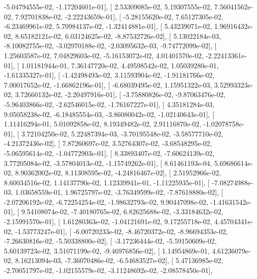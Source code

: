\documentclass{article}
\begin{document}
         -5.04794555e-02,  -1.17204601e-01],
       [  2.53309085e-02,   5.19307555e-02,   7.56041562e-02,
          7.92701838e-02,  -2.22243659e-01],
       [ -5.28155620e-02,   7.65127305e-02,  -6.23469961e-02,
          5.70984137e-02,  -1.32414881e-01],
       [  5.43239071e-02,   1.96916432e-02,   8.65182121e-02,
          6.03124625e-02,  -8.87532726e-02],
       [  5.13022184e-03,  -8.10082755e-02,  -3.02970188e-02,
         -2.03095632e-03,  -9.74772099e-02],
       [  1.25603587e-02,   7.04829603e-02,  -5.16153072e-02,
          4.01401570e-02,  -2.22413361e-01],
       [  1.01181944e-01,   7.36147720e-02,   4.49598542e-02,
          1.05039280e-01,  -1.61335327e-01],
       [ -1.42498493e-02,   3.11593904e-02,  -1.91181766e-02,
          7.00017652e-02,  -1.66862196e-01],
       [ -6.68039495e-02,   1.15951322e-03,   3.52993323e-02,
          3.72660132e-02,  -2.20497916e-01],
       [ -3.75880826e-02,  -9.87063476e-02,  -5.96403866e-02,
         -2.62546015e-02,  -1.76167227e-01],
       [  4.35181284e-03,   9.05058238e-02,  -6.18485554e-03,
         -3.86080042e-02,  -1.02140643e-01],
       [  1.11416294e-01,   5.01092858e-02,   8.19349482e-02,
          2.91116870e-02,  -1.02078758e-01],
       [  3.72104250e-02,   5.22487394e-03,  -3.70195548e-02,
         -3.58577710e-02,  -4.21372436e-02],
       [  7.87260697e-02,   3.52764307e-02,  -3.68548295e-02,
         -5.06595614e-02,  -1.04772903e-01],
       [  8.33893407e-02,  -7.60624139e-02,   3.77205084e-02,
         -3.57804013e-02,  -1.15749262e-01],
       [  8.61461193e-04,   5.69686614e-02,   8.90362002e-02,
          8.11308595e-02,  -4.24816467e-02],
       [  2.51952966e-02,   8.60034516e-02,   1.14137790e-02,
          1.12339941e-01,  -1.11225935e-01],
       [ -7.08274988e-03,   1.03658559e-01,   1.96725797e-02,
         -3.76349599e-02,  -7.87618880e-02],
       [ -2.07206192e-02,  -6.72254254e-02,  -1.98632793e-02,
          9.90447098e-02,  -1.41631542e-01],
       [  9.54108074e-02,  -7.40180765e-02,   6.82625688e-02,
         -3.33184632e-02,  -2.15991570e-01],
       [  1.61280363e-02,  -1.04121691e-02,   9.17255718e-02,
          4.45704341e-02,  -1.53773247e-01],
       [ -6.00720233e-02,  -8.46720372e-02,  -8.96694353e-02,
         -7.26630816e-02,  -5.50338800e-02],
       [ -3.17236444e-02,  -5.59150609e-02,   5.60139723e-02,
          3.51071199e-02,  -9.46976856e-02],
       [  1.14954869e-01,   4.61236079e-02,   8.16213094e-03,
         -7.36070486e-02,  -6.54683527e-02],
       [  5.47136985e-02,  -2.70051797e-02,  -1.02155579e-02,
         -3.11248692e-02,  -2.08578450e-01],
\end{document}
